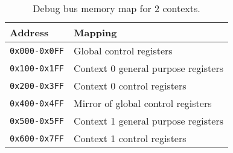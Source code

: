 \begin{itemize}
\begin{table}[h]
\centering
\caption{Debug bus memory map for 2 contexts.}
\label{tbl:core-ug-cfg-inst-iface-debug-map}
\begin{tabular}{| l | l |}
\hline
\textbf{Address}     & \textbf{Mapping} \\ \hline
\texttt{0x000-0x0FF} & Global control registers \\ \hline
\texttt{0x100-0x1FF} & Context 0 general purpose registers \\ \hline
\texttt{0x200-0x3FF} & Context 0 control registers \\ \hline
\texttt{0x400-0x4FF} & Mirror of global control registers \\ \hline
\texttt{0x500-0x5FF} & Context 1 general purpose registers \\ \hline
\texttt{0x600-0x7FF} & Context 1 control registers \\ \hline
\end{tabular}
\end{table}

\end{itemize}

